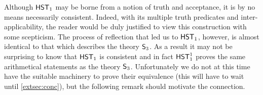 \documentclass[UKenglish,cleveref,DIV=12]{scrartcl}
\theoremstyle{definition}
\theoremstyle{definition}
\begin{document}
Although $\mathsf{HST}_1$ may be borne from a notion of
truth and acceptance, it is by no means necessarily consistent.
Indeed, with its multiple
truth predicates and inter-applicability, the reader would be duly justified to
view this construction with some scepticism. The process of reflection that led
us to $\mathsf{HST}_1$, however, is almost identical to that which describes the theory
$\mathsf{S}_3$. As a result it may not be surprising to know that $\mathsf{HST}_1$ is
consistent and in fact $\mathsf{HST}_1^1$ proves the same arithmetical statements as the
theory $\mathsf{S}_3$. Unfortunately we do not at this time have the suitable
machinery to prove their equivalence ({this will have to wait until
\cref{extsec:conc}}), but the
following remark should motivate the connection.
\end{document}
